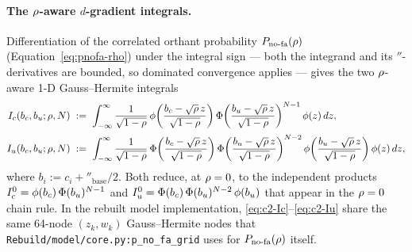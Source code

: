 \paragraph{The $\rho$-aware $d$-gradient integrals.}
Differentiation of the correlated orthant probability
$P_{\mathrm{no\text{-}fa}}(\rho)$ (Equation~\eqref{eq:pnofa-rho}) under the integral
sign --- both the integrand and its $\dprime$-derivatives are
bounded, so dominated convergence applies --- gives the two
$\rho$-aware 1-D Gauss--Hermite integrals
\begin{align}
  I_c(b_c, b_u; \rho, N)
  &\;:=\;
  \int_{-\infty}^{\infty}
  \frac{1}{\sqrt{1 - \rho}}\,
  \phi\!\left(\frac{b_c - \sqrt{\rho}\,z}{\sqrt{1 - \rho}}\right)
  \Phi\!\left(\frac{b_u - \sqrt{\rho}\,z}{\sqrt{1 - \rho}}\right)^{N - 1}
  \phi(z)\,dz,
  \label{eq:c2-Ic}
  \\[2pt]
  I_u(b_c, b_u; \rho, N)
  &\;:=\;
  \int_{-\infty}^{\infty}
  \frac{1}{\sqrt{1 - \rho}}\,
  \Phi\!\left(\frac{b_c - \sqrt{\rho}\,z}{\sqrt{1 - \rho}}\right)
  \Phi\!\left(\frac{b_u - \sqrt{\rho}\,z}{\sqrt{1 - \rho}}\right)^{N - 2}
  \phi\!\left(\frac{b_u - \sqrt{\rho}\,z}{\sqrt{1 - \rho}}\right)
  \phi(z)\,dz,
  \label{eq:c2-Iu}
\end{align}
where $b_i := c_i + \dprime_{\mathrm{base}}/2$. Both reduce, at
$\rho = 0$, to the independent products
$I_c^0 = \phi(b_c)\,\Phi(b_u)^{N - 1}$ and
$I_u^0 = \Phi(b_c)\,\Phi(b_u)^{N - 2}\,\phi(b_u)$ that
appear in the $\rho = 0$ chain rule. In the rebuilt model
implementation, \eqref{eq:c2-Ic}--\eqref{eq:c2-Iu} share the same
64-node $(z_k, w_k)$ Gauss--Hermite nodes that
\texttt{Rebuild/model/core.py:p\_no\_fa\_grid} uses for
$P_{\mathrm{no\text{-}fa}}(\rho)$ itself.

